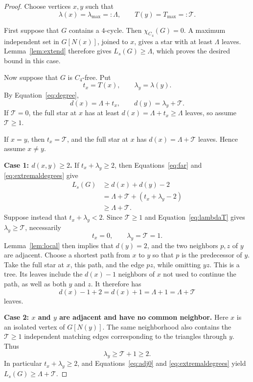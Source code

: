 \documentclass[11pt]{article}
\newcommand{\Ls}{L_s}
\newcommand{\lmax}{\lambda_{\max}}
\newcommand{\tmax}{T_{\max}}
\newcommand{\Tau}{\mathcal{T}}
\begin{document}
\begin{proof}
Choose vertices $x,y$ such that
\[
  \lambda(x)=\lmax=: \Lambda,
  \qquad
  T(y)=\tmax=: \Tau.
\]

First suppose that $G$ contains a $4$-cycle.  Then
$\chi_{C_4}(G)=0$.  A maximum independent set in $G[N(x)]$, joined to
$x$, gives a star with at least $\Lambda$ leaves.  Lemma~\ref{lem:extend}
therefore gives $\Ls(G)\ge\Lambda$, which proves the desired bound in
this case.

Now suppose that $G$ is $C_4$-free.  Put
\[
  t_x=T(x),\qquad \lambda_y=\lambda(y).
\]
By Equation~\eqref{eq:degree},
\begin{equation}\label{eq:extremaldegrees}
  d(x)=\Lambda+t_x,
  \qquad
  d(y)=\lambda_y+\Tau.
\end{equation}
If $\Tau=0$, the full star at $x$ has at least
$d(x)=\Lambda+t_x\ge\Lambda$ leaves, so assume $\Tau\ge1$.

If $x=y$, then $t_x=\Tau$, and the full star at $x$ has
$d(x)=\Lambda+\Tau$ leaves.  Hence assume $x\ne y$.

\medskip
\noindent\textbf{Case 1: $d(x,y)\ge2$.}
If $t_x+\lambda_y\ge2$, then Equations~\eqref{eq:far} and
\eqref{eq:extremaldegrees} give
\[
\begin{aligned}
  \Ls(G)
  &\ge d(x)+d(y)-2\\
  &=\Lambda+\Tau+(t_x+\lambda_y-2)\\
  &\ge\Lambda+\Tau.
\end{aligned}
\]
Suppose instead that $t_x+\lambda_y<2$.  Since $\Tau\ge1$ and
Equation~\eqref{eq:lambdaT} gives $\lambda_y\ge\Tau$, necessarily
\[
  t_x=0,\qquad \lambda_y=\Tau=1.
\]
Lemma~\ref{lem:local} then implies that $d(y)=2$, and the two neighbors
$p,z$ of $y$ are adjacent.  Choose a shortest path from $x$ to $y$ so
that $p$ is the predecessor of $y$.  Take the full star at $x$, this
path, and the edge $pz$, while omitting $yz$.  This is a tree.  Its
leaves include the $d(x)-1$ neighbors of $x$ not used to continue the
path, as well as both $y$ and $z$.  It therefore has
\[
  d(x)-1+2=d(x)+1=\Lambda+1=\Lambda+\Tau
\]
leaves.

\medskip
\noindent\textbf{Case 2: $x$ and $y$ are adjacent and have no common
neighbor.}
Here $x$ is an isolated vertex of $G[N(y)]$.  The same neighborhood
also contains the $\Tau\ge1$ independent matching edges corresponding
to the triangles through $y$.  Thus
\[
  \lambda_y\ge\Tau+1\ge2.
\]
In particular $t_x+\lambda_y\ge2$, and Equations~\eqref{eq:adj0} and
\eqref{eq:extremaldegrees} yield $\Ls(G)\ge\Lambda+\Tau$.


\end{proof}
\end{document}
